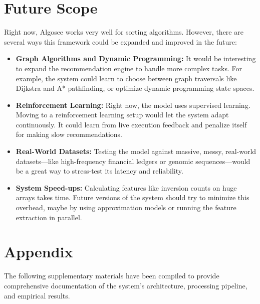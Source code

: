 \documentclass[12pt,a4paper,oneside,openany]{report}
\begin{document}
\chapter{Future Scope}
Right now, Algosee works very well for sorting algorithms. However, there are several ways this framework could be expanded and improved in the future:
\begin{itemize}
    \item \textbf{Graph Algorithms and Dynamic Programming:} It would be interesting to expand the recommendation engine to handle more complex tasks. For example, the system could learn to choose between graph traversals like Dijkstra and A* pathfinding, or optimize dynamic programming state spaces.
    \item \textbf{Reinforcement Learning:} Right now, the model uses supervised learning. Moving to a reinforcement learning setup would let the system adapt continuously. It could learn from live execution feedback and penalize itself for making slow recommendations.
    \item \textbf{Real-World Datasets:} Testing the model against massive, messy, real-world datasets---like high-frequency financial ledgers or genomic sequences---would be a great way to stress-test its latency and reliability.
    \item \textbf{System Speed-ups:} Calculating features like inversion counts on huge arrays takes time. Future versions of the system should try to minimize this overhead, maybe by using approximation models or running the feature extraction in parallel.
\end{itemize}

\chapter*{Appendix}
The following supplementary materials have been compiled to provide comprehensive documentation of the system's architecture, processing pipeline, and empirical results.
\end{document}

